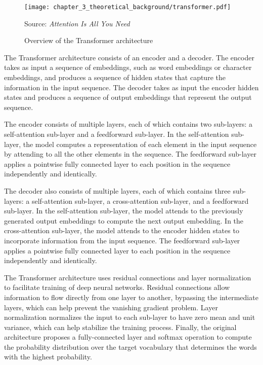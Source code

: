 \begin{figure}[h]
	\centering
	\texttt{[image: chapter\_3\_theoretical\_background/transformer.pdf]}
	\caption{Overview of the Transformer architecture}
	Source: \textit{Attention Is All You Need} \cite{vaswani2017attention}
	\label{fig:chapter_3_theoretical_background/transformer}
\end{figure}

The Transformer architecture consists of an encoder and a decoder. The encoder takes as input a sequence of embeddings, such as word embeddings or character embeddings, and produces a sequence of hidden states that capture the information in the input sequence. The decoder takes as input the encoder hidden states and produces a sequence of output embeddings that represent the output sequence.

The encoder consists of multiple layers, each of which contains two sub-layers: a self-attention sub-layer and a feedforward sub-layer. In the self-attention sub-layer, the model computes a representation of each element in the input sequence by attending to all the other elements in the sequence. The feedforward sub-layer applies a pointwise fully connected layer to each position in the sequence independently and identically.

The decoder also consists of multiple layers, each of which contains three sub-layers: a self-attention sub-layer, a cross-attention sub-layer, and a feedforward sub-layer. In the self-attention sub-layer, the model attends to the previously generated output embeddings to compute the next output embedding. In the cross-attention sub-layer, the model attends to the encoder hidden states to incorporate information from the input sequence. The feedforward sub-layer applies a pointwise fully connected layer to each position in the sequence independently and identically.

The Transformer architecture uses residual connections and layer normalization to facilitate training of deep neural networks. Residual connections allow information to flow directly from one layer to another, bypassing the intermediate layers, which can help prevent the vanishing gradient problem. Layer normalization normalizes the input to each sub-layer to have zero mean and unit variance, which can help stabilize the training process. Finally, the original architecture proposes a fully-connected layer and softmax operation to compute the probability distribution over the target vocabulary that determines the words with the highest probability.

